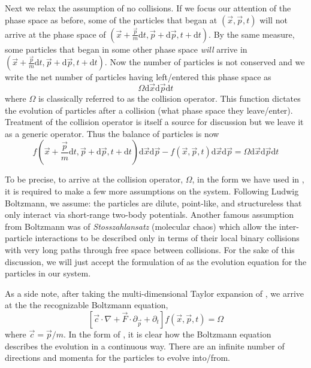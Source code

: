 Next we relax the assumption of no collisions. If we focus our attention of the phase space as before, some of the particles that began at $(\vec{x},\vec{p},t)$ will not arrive at the phase space of $(\vec{x} + \frac{\vec{p}}{m}\mathrm{d}t,\vec{p} + \mathrm{d}\vec{p},t + \mathrm{d}t)$. By the same measure, some particles that began in some other phase space \textit{will} arrive in $(\vec{x} + \frac{\vec{p}}{m}\mathrm{d}t,\vec{p} + \mathrm{d}\vec{p},t + \mathrm{d}t)$. Now the number of particles is not conserved and we write the net number of particles having left/entered this phase space as
\begin{equation}
	\Omega\mathrm{d}\vec{x}\mathrm{d}\vec{p}\mathrm{d}t
\end{equation}
where $\Omega$ is classically referred to as the collision operator. This function dictates the evolution of particles after a collision (what phase space they leave/enter). Treatment of the collision operator is itself a source for discussion but we leave it as a generic operator. Thus the balance of particles is now
\begin{equation}\label{eq:particle-balance}
	f(\vec{x} + \frac{\vec{p}}{m}\mathrm{d}t,\vec{p} + \mathrm{d}\vec{p},t + \mathrm{d}t)\mathrm{d}\vec{x}\mathrm{d}\vec{p} - f(\vec{x},\vec{p},t)\mathrm{d}\vec{x}\mathrm{d}\vec{p} = \Omega\mathrm{d}\vec{x}\mathrm{d}\vec{p}\mathrm{d}t
\end{equation}

To be precise, to arrive at the collision operator, $\Omega$, in the form we have used in , it is required to make a few more assumptions on the system. Following Ludwig Boltzmann, we assume: the particles are dilute, point-like, and structureless that only interact via short-range two-body potentials. Another famous assumption from Boltzmann was of \textit{Stosszahlansatz} (molecular chaos) which allow the inter-particle interactions to be described only in terms of their local binary collisions with very long paths through free space between collisions.\cite{succi2001lattice} For the sake of this discussion, we will just accept the formulation of  as the evolution equation for the particles in our system. 

As a side note, after taking the multi-dimensional Taylor expansion of , we arrive at the the recognizable Boltzmann equation,
\begin{equation}\label{eq:boltzmann-continuum}
	\left[\vec{c}\cdot\nabla + \vec{F}\cdot\partial_\vec{p}  + \partial_t\right] f(\vec{x},\vec{p},t) = \Omega
\end{equation}
where $\vec{c} = \vec{p}/m$. In the form of , it is clear how the Boltzmann equation describes the evolution in a continuous way. There are an infinite number of directions and momenta for the particles to evolve into/from. 

